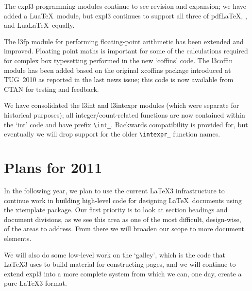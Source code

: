 \documentclass{ltnews}
\begin{document}
The \textsf{expl3} programming modules continue to see revision and expansion; we have added a Lua\TeX\ module, but \textsf{expl3} continues to support all three of pdf\LaTeX, \XeLaTeX, and Lua\LaTeX\ equally.

The \textsf{l3fp} module for performing floating-point arithmetic has been extended and improved. Floating point maths is important for some of the calculations required for complex box typesetting performed in the new `coffins' code.
The \textsf{l3coffin} module has been added based on the original \textsf{xcoffins} package introduced at TUG~2010 as reported in the last news issue; this code is now available from CTAN for testing and feedback.

We have consolidated the \textsf{l3int} and \textsf{l3intexpr} modules (which were separate for historical purposes); all integer/count-related functions are now contained within the `\textsf{int}' code and have prefix \verb|\int_|. Backwards compatibility is provided for, but eventually we will drop support for the older \verb|\intexpr_| function names.

\section{Plans for 2011}

In the following year, we plan to use the current \LaTeX3 infrastructure to continue work in building high-level code for designing \LaTeX\ documents using the \textsf{xtemplate} package. Our first priority is to look at section headings and document divisions, as we see this area as one of the most difficult, design-wise, of the areas to address. From there we will broaden our scope to more document elements.

We will also do some low-level work on the `galley', which is the code that \LaTeX3 uses to build material for constructing pages, and we will continue to extend \textsf{expl3} into a more complete system from which we can, one day, create a pure \LaTeX3 format.
\end{document}

